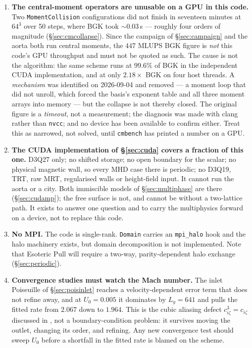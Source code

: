 \documentclass[11pt,a4paper]{article}
\newcommand{\code}[1]{\texttt{\small #1}}
\begin{document}
\begin{enumerate}[leftmargin=1.4em,itemsep=4pt]
\item \textbf{The central-moment operators are unusable on a GPU in this code.}
  Two \code{MomentCollision} configurations did not finish in seventeen minutes at
  $64^3$ over 50 steps, where BGK took $\sim0.03$\,s --- roughly four orders of
  magnitude (\S\ref{sec:cmcollapse}). Since the campaign of \S\ref{sec:campaign}
  and the aorta both run central moments, the $447$ MLUPS BGK figure is
  \emph{not} this code's GPU throughput and must not be quoted as such. The
  cause is not the algorithm: the same scheme runs at $99.6\%$ of BGK in the
  independent CUDA implementation, and at only $2.18\times$ BGK on four host
  threads. A \emph{mechanism} was identified on 2026-09-04 and removed --- a
  moment loop that did not unroll, which forced the basis's exponent table and
  all three moment arrays into memory --- but the collapse is not thereby
  closed. The original figure is a \emph{timeout}, not a measurement; the
  diagnosis was made with clang rather than \code{nvcc}; and no device has been
  available to confirm either. Treat this as narrowed, not solved, until
  \code{cmbench} has printed a number on a GPU.

\item \textbf{The CUDA implementation of \S\ref{sec:cuda} covers a fraction of
  this one.} D3Q27 only; no shifted storage; no open boundary for the scalar; no
  physical magnetic wall, so every MHD case there is periodic; no D3Q19, TRT, raw
  MRT, regularised walls or height-field input. It cannot run the aorta or a city.
  Both immiscible models of \S\ref{sec:multiphase} are there
  (\S\ref{sec:cudamp}); the free surface is not, and cannot be without a
  two-lattice path. It exists to answer one question and to carry the
  multiphysics forward on a device, not to replace this code.

\item \textbf{No MPI.} The code is single-rank. \code{Domain} carries an
  \code{mpi\_halo} hook and the halo machinery exists, but domain decomposition
  is not implemented. Note that Esoteric Pull will require a two-way,
  parity-dependent halo exchange (\S\ref{sec:periodic}).

\item \textbf{Convergence studies must watch the Mach number.} The inlet
Poiseuille of \S\ref{sec:poisinlet} reaches a velocity-dependent error term
that does not refine away, and at $U_0 = 0.005$ it dominates by $L_y = 641$ and
pulls the fitted rate from $2.067$ down to $1.964$. This is the cubic aliasing
defect $c_{i\zeta}^3 = c_{i\zeta}$ discussed in \cite{derosis2020}, not a
boundary-condition problem: it survives moving the outlet, changing its order,
and refining. Any new convergence test should sweep $U_0$ before a shortfall in
the fitted rate is blamed on the scheme.


\end{enumerate}
\end{document}
